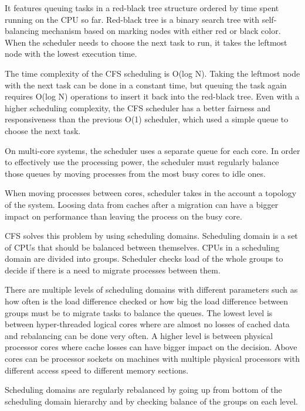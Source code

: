 It features queuing tasks in a red-black tree structure ordered by time spent
running on the CPU so far. Red-black tree is a binary search
tree with self-balancing mechanism based on marking nodes with either red or
black color.
When the scheduler needs to choose the next task to run, it
takes the leftmost node with the lowest execution time. 

The time complexity of the CFS scheduling is O(log N). Taking the leftmost node
with the next task can be done in a constant time, but queuing the task again
requires O(log N) operations to insert it back into the red-black tree. Even
with a higher scheduling complexity, the CFS scheduler has a better fairness and
responsiveness than the previous O(1) scheduler, which used a simple queue to
choose the next task.

On multi-core systems, the scheduler uses a separate queue for each core. In
order to effectively use the processing power, the scheduler must regularly
balance those queues by moving processes from the most busy cores to idle ones.

When moving processes between cores, scheduler takes in the account a topology
of the system. Loosing data from caches after a migration can have a bigger
impact on performance than leaving the process on the busy core.

CFS solves this problem by using scheduling domains. Scheduling domain is a set
of CPUs that should be balanced between themselves. CPUs in a scheduling domain
are divided into groups. Scheduler checks load of the whole groups to decide if
there is a need to migrate processes between them.

There are multiple levels of scheduling domains with different parameters such as
how often is the load difference checked or how big the load difference between
groups must be to migrate tasks to balance the queues.
The lowest level is between hyper-threaded logical cores where are almost no
losses of cached data and rebalancing can be done very often.
A higher level is between physical processor cores where  cache losses can have
bigger impact on the decision.
Above cores can be processor sockets on machines with multiple physical
processors with different access speed to different memory sections.

Scheduling domains are regularly rebalanced by going up from bottom of the
scheduling domain hierarchy and by checking balance of the groups on each level.

